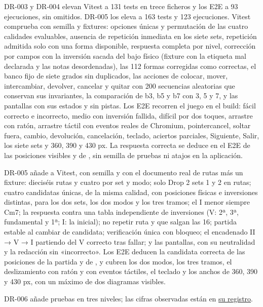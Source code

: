 \documentclass[a4paper,11pt]{article}
\let\originaltexttt\texttt
\renewcommand{\texttt}[1]{\originaltexttt{\seqsplit{#1}}}
\begin{document}
DR-003 y DR-004 elevan Vitest a 131 tests en trece ficheros y los E2E a
93 ejecuciones, sin omitidos. DR-005 los eleva a 163 tests y 123
ejecuciones. Vitest comprueba con semilla y fixtures: opciones únicas y
permutación de las cuatro calidades evaluables, ausencia de repetición
inmediata en los siete sets, repetición admitida solo con una forma
disponible, respuesta completa por nivel, corrección por campos con la
inversión sacada del bajo físico (fixture con la etiqueta mal declarada
y las notas desordenadas), las 112 formas corregidas como correctas, el
banco fijo de siete grados sin duplicados, las acciones de colocar,
mover, intercambiar, devolver, cancelar y quitar con 200 secuencias
aleatorias que conservan sus invariantes, la comparación de b3, b5 y b7
con 3, 5 y 7, y las pantallas con sus estados y sin pistas. Los E2E
recorren el juego en el build: fácil correcto e incorrecto, medio con
inversión fallida, difícil por dos toques, arrastre con ratón, arrastre
táctil con eventos reales de Chromium, pointercancel, soltar fuera,
cambio, devolución, cancelación, teclado, aciertos parciales, Siguiente,
Salir, los siete sets y 360, 390 y 430 px. La respuesta correcta se
deduce en el E2E de las posiciones visibles y de
\texttt{data/catalog.json}, sin semilla de pruebas ni atajos en la
aplicación.

DR-005 añade a Vitest, con semilla y con el documento real de rutas más
un fixture: dieciséis rutas y cuatro por set y modo; solo Drop 2 sets 1
y 2 en rutas; cuatro candidatas únicas, de la misma calidad, con
posiciones físicas e inversiones distintas, para los dos sets, los dos
modos y los tres tramos; el I menor siempre Cm7; la respuesta contra una
tabla independiente de inversiones (V: 2ª, 3ª, fundamental y 1ª; I: la
inicial); no repetir ruta y que salgan las 16; partida estable al
cambiar de candidata; verificación única con bloqueo; el encadenado II →
V → I partiendo del V correcto tras fallar; y las pantallas, con su
neutralidad y la redacción sin «incorrecto». Los E2E deducen la
candidata correcta de las posiciones de la partida y de
\texttt{data/routes.json}, y cubren los dos modos, los tres tramos, el
deslizamiento con ratón y con eventos táctiles, el teclado y los anchos
de 360, 390 y 430 px, con un máximo de dos diagramas visibles.

DR-006 añade pruebas en tres niveles; las cifras observadas están en
\href{validation/2026-10-14-dr-006-progress-and-pwa.md}{su registro}.
\end{document}
